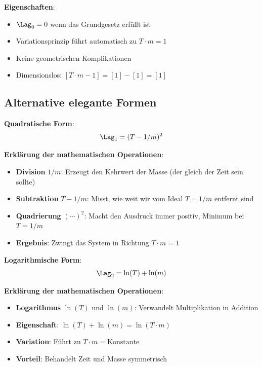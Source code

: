 	\textbf{Eigenschaften}:
	\begin{itemize}
		\item $\Lag_0 = 0$ wenn das Grundgesetz erfüllt ist
		\item Variationsprinzip führt automatisch zu $T \cdot m = 1$
		\item Keine geometrischen Komplikationen
		\item Dimensionslos: $[T \cdot m - 1] = [1] - [1] = [1]$
	\end{itemize}
	
	\subsection{Alternative elegante Formen}
	
	\textbf{Quadratische Form}:
	\begin{equation}
		\Lag_1 = (T - 1/m)^2
		\label{eq:quadratic_form}
	\end{equation}
	
	\textbf{Erklärung der mathematischen Operationen}:
	\begin{itemize}
		\item \textbf{Division} $1/m$: Erzeugt den Kehrwert der Masse (der gleich der Zeit sein sollte)
		\item \textbf{Subtraktion} $T - 1/m$: Misst, wie weit wir vom Ideal $T = 1/m$ entfernt sind
		\item \textbf{Quadrierung} $(\cdots)^2$: Macht den Ausdruck immer positiv, Minimum bei $T = 1/m$
		\item \textbf{Ergebnis}: Zwingt das System in Richtung $T \cdot m = 1$
	\end{itemize}
	
	\textbf{Logarithmische Form}:
	\begin{equation}
		\Lag_2 = \ln(T) + \ln(m)
		\label{eq:logarithmic_form}
	\end{equation}
	
	\textbf{Erklärung der mathematischen Operationen}:
	\begin{itemize}
		\item \textbf{Logarithmus} $\ln(T)$ und $\ln(m)$: Verwandelt Multiplikation in Addition
		\item \textbf{Eigenschaft}: $\ln(T) + \ln(m) = \ln(T \cdot m)$
		\item \textbf{Variation}: Führt zu $T \cdot m = \text{Konstante}$
		\item \textbf{Vorteil}: Behandelt Zeit und Masse symmetrisch
	\end{itemize}
	
